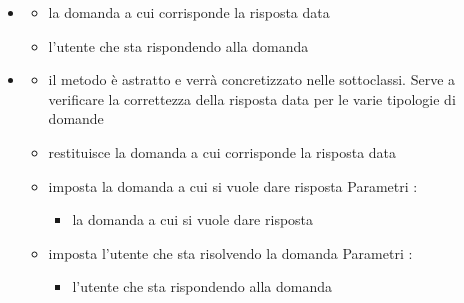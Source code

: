 \begin{itemize}
\item {}
\begin{itemize}
\item {}
\newline
la domanda a cui corrisponde la risposta data
\item {}
\newline
l'utente che sta rispondendo alla domanda
\end{itemize}
\item {}
\begin{itemize}
\item {}
\newline
il metodo è astratto e verrà concretizzato nelle sottoclassi. Serve a verificare la correttezza della risposta data per le varie tipologie di domande
\newline
\item {}
\newline
restituisce la domanda a cui corrisponde la risposta data
\newline
\item {}
\newline
imposta la domanda a cui si vuole dare risposta
\newline
Parametri :
\begin{itemize}
\item {}
\newline
la domanda a cui si vuole dare risposta
\end{itemize}
\item {}
\newline
imposta l'utente che sta risolvendo la domanda
\newline
Parametri :
\begin{itemize}
\item {}
\newline
l'utente che sta rispondendo alla domanda
\end{itemize}
\end{itemize}
\end{itemize}
